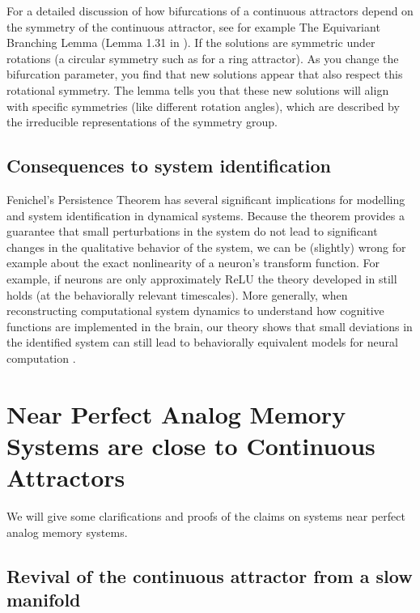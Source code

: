 \documentclass{article} %
\newcommand{\ascomment}[1]{\textcolor{ascolor}{(#1)}}
\newcounter{ct}
\theoremstyle{definition}
\theoremstyle{remark}
\begin{document}
For a detailed discussion of how bifurcations of a continuous attractors depend on the symmetry of the continuous attractor, see for example The Equivariant Branching Lemma (Lemma 1.31 in \citep{golubitsky2002symmetry}).
If the solutions are symmetric under rotations (a circular symmetry such as for a ring attractor).
As you change the bifurcation parameter, you find that new solutions appear that also respect this rotational symmetry.
The lemma tells you that these new solutions will align with specific symmetries (like different rotation angles), which are described by the irreducible representations of the symmetry group.





\subsection{Consequences to system identification}
Fenichel's Persistence Theorem has several significant implications for modelling and system identification in dynamical systems.
Because the theorem provides a guarantee that small perturbations in the system do not lead to significant changes in the qualitative behavior of the system,
we can be (slightly) wrong for example about the exact nonlinearity of a neuron's transform function.
For example, if neurons are only approximately ReLU the theory developed in \citep{biswas2022geometric} still holds (at the behaviorally relevant timescales).
More generally, when reconstructing computational system dynamics to understand how cognitive functions are implemented in the brain, our theory shows that small deviations in the identified system can still lead to behaviorally equivalent models for neural computation \citep{durstewitz2023reconstructing}.



\newpage
\section{Near Perfect Analog Memory Systems are close to Continuous Attractors}
We will give some clarifications and proofs of the claims on systems near perfect analog memory systems.

\subsection{Revival of the continuous attractor from a slow manifold}\label{sec:supp:proofprop1}
\end{document}
